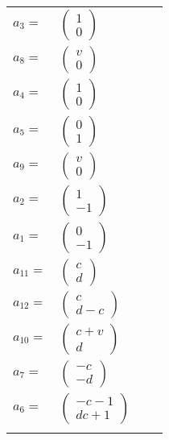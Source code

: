 \documentclass[1p]{elsarticle_modified}
\theoremstyle{definition}
\begin{document}
\begin{tabular}{m{7pt} m{180pt} m{7pt} m{180pt} }
\flushright $a_{3}=$&$\begin{pmatrix}1\\0\end{pmatrix}$ \\
\flushright $a_{8}=$&$\begin{pmatrix}v\\0\end{pmatrix}$ \\
\flushright $a_{4}=$&$\begin{pmatrix}1\\0\end{pmatrix}$ \\
\flushright $a_{5}=$&$\begin{pmatrix}0\\1\end{pmatrix}$ \\
\flushright $a_{9}=$&$\begin{pmatrix}v\\0\end{pmatrix}$ \\
\flushright $a_{2}=$&$\begin{pmatrix}1\\-1\end{pmatrix}$ \\
\flushright $a_{1}=$&$\begin{pmatrix}0\\-1\end{pmatrix}$ \\
\flushright $a_{11}=$&$\begin{pmatrix}c\\d\end{pmatrix}$ \\
\flushright $a_{12}=$&$\begin{pmatrix}c\\d- c\end{pmatrix}$ \\
\flushright $a_{10}=$&$\begin{pmatrix}c+v\\d\end{pmatrix}$ \\
\flushright $a_{7}=$&$\begin{pmatrix}- c\\- d\end{pmatrix}$ \\
\flushright $a_{6}=$&$\begin{pmatrix}- c-1\\d c+1\end{pmatrix}$\\&\end{tabular}
\end{document}
